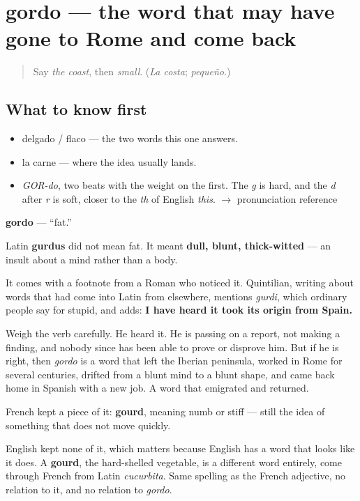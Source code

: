 \section[gordo]{gordo — the word that may have gone to Rome and come back}

\label{lesson:ES-C371-gordo}



\begin{quote}
Say \emph{the coast}, then \emph{small}. (\emph{La costa}; \emph{pequeño}.)
\end{quote}

\subsection*{What to know first}
\begin{itemize}
\raggedright
  \item delgado / flaco — the two words this one answers.
  \item la carne — where the idea usually lands.
\end{itemize}

\begin{sounds}
\begin{itemize}
\raggedright
  \item \emph{GOR-do}, two beats with the weight on the first. The \emph{g} is hard, and the \emph{d} after \emph{r} is soft, closer to the \emph{th} of English \emph{this}. $\to$ pronunciation reference
\end{itemize}
\end{sounds}

\begin{cousinweb}
\textbf{gordo} — \textquotedblleft{}fat.\textquotedblright{}

Latin \textbf{gurdus} did not mean fat. It meant \textbf{dull, blunt, thick-witted} — an insult about a mind rather than a body.

It comes with a footnote from a Roman who noticed it. Quintilian, writing about words that had come into Latin from elsewhere, mentions \emph{gurdi}, which ordinary people say for stupid, and adds: \textbf{I have heard it took its origin from Spain.}

Weigh the verb carefully. He heard it. He is passing on a report, not making a finding, and nobody since has been able to prove or disprove him. But if he is right, then \emph{gordo} is a word that left the Iberian peninsula, worked in Rome for several centuries, drifted from a blunt mind to a blunt shape, and came back home in Spanish with a new job. A word that emigrated and returned.

French kept a piece of it: \textbf{gourd}, meaning numb or stiff — still the idea of something that does not move quickly.

English kept none of it, which matters because English has a word that looks like it does. A \textbf{gourd}, the hard-shelled vegetable, is a different word entirely, come through French from Latin \emph{cucurbita}. Same spelling as the French adjective, no relation to it, and no relation to \emph{gordo}.
\end{cousinweb}

